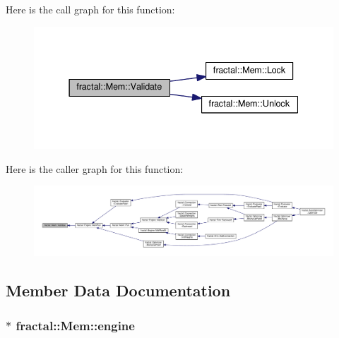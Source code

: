 Here is the call graph for this function\+:\nopagebreak
\begin{figure}[H]
\begin{center}
\leavevmode
\includegraphics[width=337pt]{d2/d2d/classfractal_1_1Mem_a81f0764f0de4a0f4ac82f298295ae6b5_cgraph}
\end{center}
\end{figure}




Here is the caller graph for this function\+:\nopagebreak
\begin{figure}[H]
\begin{center}
\leavevmode
\includegraphics[width=350pt]{d2/d2d/classfractal_1_1Mem_a81f0764f0de4a0f4ac82f298295ae6b5_icgraph}
\end{center}
\end{figure}




\subsection{Member Data Documentation}
\hypertarget{classfractal_1_1Mem_a36371a8e475f1aad6df2fc0243c0db58}{
\subsubsection[{engine}]{$\ast$ fractal\+::\+Mem\+::engine\hspace{0.3cm}{\ttfamily [protected]}}}\label{classfractal_1_1Mem_a36371a8e475f1aad6df2fc0243c0db58}


